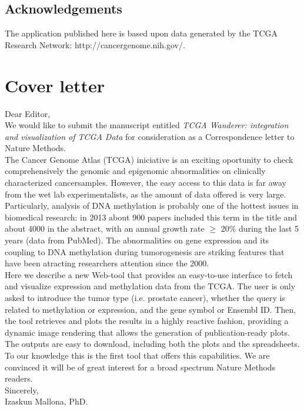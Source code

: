 \documentclass{article}
\begin{document}

\subsection{Acknowledgements}
The application published here is based upon data generated by the TCGA Research Network: http://cancergenome.nih.gov/.








\section*{Cover letter}


Dear Editor,\\

We would like to submit the manuscript entitled \textit{TCGA Wanderer: integration and visualization of TCGA Data} for consideration as a Correspondence letter to Nature Methods.\\

The Cancer Genome Atlas (TCGA) iniciative is an exciting oportunity to check comprehensively the genomic and epigenomic abnormalities on clinically characterized cancersamples. However, the easy access to this data is far away from the wet lab experimentalists, as the amount of data offered is very large.\\

Particularly, analysis of DNA methylation is probably one of the hottest issues in biomedical research: in 2013 about 900 papers included this term in the title and about 4000 in the abstract, with an annual growth rate $\ge$ 20\% during the last 5 years (data from PubMed). The abnormalities on gene expression and its coupling to DNA methylation during tumorogenesis are striking features that have been atracting researchers attention since the 2000.\\

Here we describe a new Web-tool that provides an easy-to-use interface to fetch and visualize expression and methylation data from the TCGA. The user is only asked to introduce the tumor type (i.e. prostate cancer), whether the query is related to methylation or expression, and the gene symbol or Ensembl ID. Then, the tool retrieves and plots the results in a highly reactive fashion, providing a dynamic image rendering that allows the generation of publication-ready plots. The outputs are easy to download, including both the plots and the spreadsheets.\\

To our knowledge this is the first tool that offers this capabilities. We are convinced it will be of great interest for a broad spectrum Nature Methods readers.\\


Sincerely, \\
Izaskun Mallona, PhD.
\end{document}
